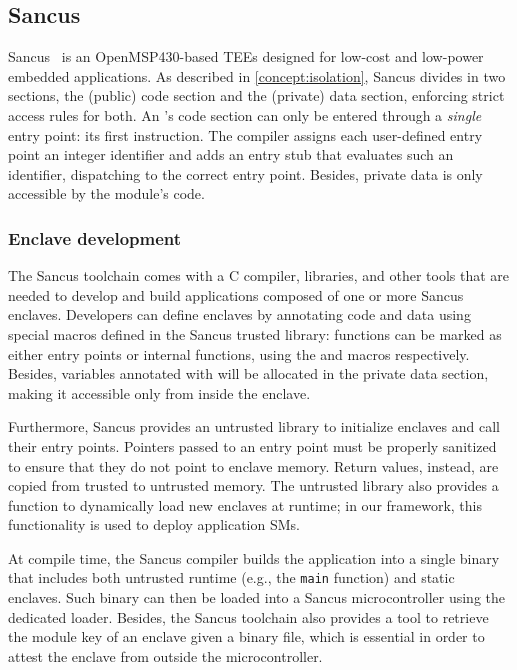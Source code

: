 \subsection{Sancus}
%
\label{impl:sancus}
%
Sancus~\cite{sancus} is an OpenMSP430-based \acp{TEE} designed for low-cost and
low-power embedded applications.  As described in \cref{concept:isolation},
Sancus divides \protmods{} in two sections, the (public) code section and the
(private) data section, enforcing strict access rules for both.  An \protmod{}'s
code section can only be entered through a \emph{single} entry point: its first
instruction. The compiler assigns each user-defined entry point an
integer identifier and adds an entry stub that evaluates such an identifier,
dispatching to the correct entry point. Besides, private data is only accessible
by the module's code.

\subsubsection{Enclave development}
% 
\label{impl:sancus-development}

The Sancus toolchain comes with a C compiler, libraries, and other tools that
are needed to develop and build applications composed of one or more Sancus
enclaves. Developers can define enclaves by annotating code and data using
special macros defined in the Sancus trusted library: functions can be marked as
either entry points or internal functions, using the \smentry{} and \smfunc{}
macros respectively. Besides, variables annotated with \smdata{} will be
allocated in the private data section, making it accessible only from inside the
enclave. 

Furthermore, Sancus provides an untrusted library to initialize enclaves and
call their entry points. Pointers passed to an entry point must be properly
sanitized to ensure that they do not point to enclave memory. Return values,
instead, are copied from trusted to untrusted memory. The untrusted library also
provides a function to dynamically load new enclaves at runtime; in our
framework, this functionality is used to deploy application \acp{SM}.

At compile time, the Sancus compiler builds the application into a single binary
that includes both untrusted runtime (e.g., the \texttt{main} function) and
static enclaves. Such binary can then be loaded into a Sancus microcontroller
using the dedicated loader. Besides, the Sancus toolchain also provides a tool
to retrieve the module key of an enclave given a binary file, which is essential
in order to attest the enclave from outside the microcontroller.

